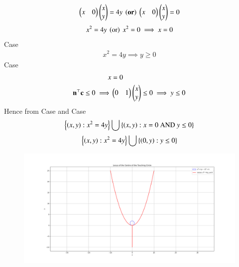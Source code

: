 \documentclass[journal]{IEEEtran}
\begin{document}
\begin{align}
\myvec{x&0}\myvec{x\\y}=4y\ \brak{\textbf{or}}\ \myvec{x&0}\myvec{x\\y}=0 
\end{align}
\begin{align}
x^2=4y\ \left(\text{or}\right)\ x^2=0 \implies x=0
\end{align}
Case 
\begin{align}
x^2=4y \implies y\geq0
\end{align}
Case 
\begin{align}
x&=0\\ 
\mathbf{n}^\top\mathbf{c}\leq0 \implies& \begin{pmatrix}0&1\end{pmatrix}\begin{pmatrix}x\\y\end{pmatrix} \leq 0 \implies y\leq 0
\end{align}
Hence from Case  and Case 
\begin{align}
    \cbrak{\brak{x,y}:x^2=4y} \bigcup \cbrak{\brak{x,y}:x=0\ \text{AND}\ y\leq0}
\end{align}
\begin{align}
    \left\{\left(x,y\right):x^2=4y\right\} \bigcup \left\{\left(0,y\right):y\leq0\right\}
\end{align}
\begin{figure}[H]
   \centering
   \includegraphics[width=0.7\columnwidth]{figs/fig1.png}
	\caption{}
   \label{}
\end{figure}
\end{document}
